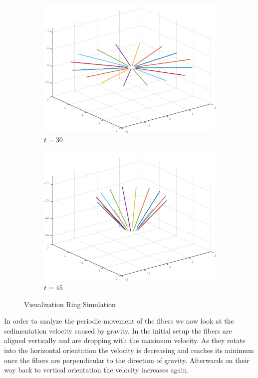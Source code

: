 \documentclass[a4paper,11pt]{kth-mag}
\begin{document}
\begin{figure}[!htbp]
\begin{subfigure}[h]{0.45\textwidth}
    \includegraphics[width=\textwidth]{img/ring_00030.pdf}
    \caption{$t=30$}\label{fig:ring_simulation_1c}
  \end{subfigure}
  \begin{subfigure}[h]{0.45\textwidth}
    \centering
    \includegraphics[width=\textwidth]{img/ring_00045.pdf}
    \caption{$t=45$}\label{fig:ring_simulation_1d}
  \end{subfigure}
  \caption{Visualization Ring Simulation}
  \label{fig:ring_simulation}
\end{figure}

In order to analyze the periodic movement of the fibers we now look at the sedimentation velocity caused by gravity. In the initial setup the fibers are aligned vertically and are dropping with the maximum velocity. As they rotate into the horizontal orientation the velocity is decreasing and reaches its minimum once the fibers are perpendicular to the direction of gravity. Afterwards on their way back to vertical orientation the velocity increases again.
\end{document}
